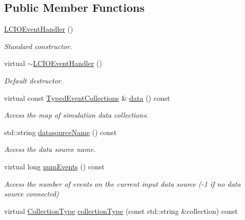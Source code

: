 \subsection*{Public Member Functions}
\begin{DoxyCompactItemize}
\item 
\hyperlink{class_d_d4hep_1_1_l_c_i_o_event_handler_a0b2f4815441b47379605f1059f892a59}{L\+C\+I\+O\+Event\+Handler} ()
\begin{DoxyCompactList}\small\item\em Standard constructor. \end{DoxyCompactList}\item 
virtual \hyperlink{class_d_d4hep_1_1_l_c_i_o_event_handler_a26f3acb33ae47d75cee43a2268e5945b}{$\sim$\+L\+C\+I\+O\+Event\+Handler} ()
\begin{DoxyCompactList}\small\item\em Default destructor. \end{DoxyCompactList}\item 
virtual const \hyperlink{class_d_d4hep_1_1_event_handler_a4d441ff8a824b1e2f278e8b7a6391af3}{Typed\+Event\+Collections} \& \hyperlink{class_d_d4hep_1_1_l_c_i_o_event_handler_af024dd8d16f2b4b686aa83708451522f}{data} () const
\begin{DoxyCompactList}\small\item\em Access the map of simulation data collections. \end{DoxyCompactList}\item 
std\+::string \hyperlink{class_d_d4hep_1_1_l_c_i_o_event_handler_ace6d753b27597445ebfe9e77f1c1afcf}{datasource\+Name} () const
\begin{DoxyCompactList}\small\item\em Access the data source name. \end{DoxyCompactList}\item 
virtual long \hyperlink{class_d_d4hep_1_1_l_c_i_o_event_handler_a9fb0b8033c171dc3a41eab1a439547e8}{num\+Events} () const
\begin{DoxyCompactList}\small\item\em Access the number of events on the current input data source (-\/1 if no data source connected) \end{DoxyCompactList}\item 
virtual \hyperlink{class_d_d4hep_1_1_event_handler_a0b22a141a019364495835317fad48254}{Collection\+Type} \hyperlink{class_d_d4hep_1_1_l_c_i_o_event_handler_a7c3518a706040840f32c6f1323b2b8ca}{collection\+Type} (const std\+::string \&collection) const

\end{DoxyCompactItemize}
